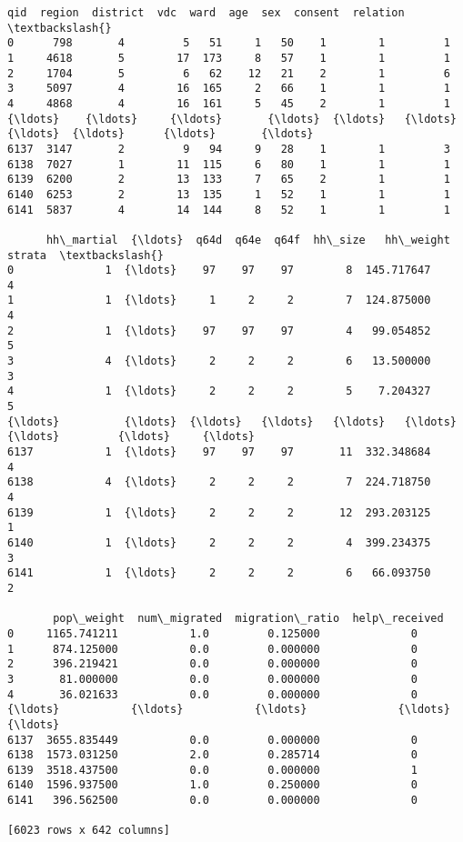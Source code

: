 \documentclass[11pt]{article}
\makeatletter
\newcommand{\boxspacing}{\kern\kvtcb@left@rule\kern\kvtcb@boxsep}
\newcommand{\prompt}[4]{
        {\ttfamily\llap{{\color{#2}[#3]:\hspace{3pt}#4}}\vspace{-\baselineskip}}
    }
\makeatother
\begin{document}
            \begin{tcolorbox}[breakable, size=fbox, boxrule=.5pt, pad at break*=1mm, opacityfill=0]
\prompt{Out}{outcolor}{13}{\boxspacing}
\begin{Verbatim}[commandchars=\\\{\}]
       qid  region  district  vdc  ward  age  sex  consent  relation  \textbackslash{}
0      798       4         5   51     1   50    1        1         1
1     4618       5        17  173     8   57    1        1         1
2     1704       5         6   62    12   21    2        1         6
3     5097       4        16  165     2   66    1        1         1
4     4868       4        16  161     5   45    2        1         1
{\ldots}    {\ldots}     {\ldots}       {\ldots}  {\ldots}   {\ldots}  {\ldots}  {\ldots}      {\ldots}       {\ldots}
6137  3147       2         9   94     9   28    1        1         3
6138  7027       1        11  115     6   80    1        1         1
6139  6200       2        13  133     7   65    2        1         1
6140  6253       2        13  135     1   52    1        1         1
6141  5837       4        14  144     8   52    1        1         1

      hh\_martial  {\ldots}  q64d  q64e  q64f  hh\_size   hh\_weight  strata  \textbackslash{}
0              1  {\ldots}    97    97    97        8  145.717647       4
1              1  {\ldots}     1     2     2        7  124.875000       4
2              1  {\ldots}    97    97    97        4   99.054852       5
3              4  {\ldots}     2     2     2        6   13.500000       3
4              1  {\ldots}     2     2     2        5    7.204327       5
{\ldots}          {\ldots}  {\ldots}   {\ldots}   {\ldots}   {\ldots}      {\ldots}         {\ldots}     {\ldots}
6137           1  {\ldots}    97    97    97       11  332.348684       4
6138           4  {\ldots}     2     2     2        7  224.718750       4
6139           1  {\ldots}     2     2     2       12  293.203125       1
6140           1  {\ldots}     2     2     2        4  399.234375       3
6141           1  {\ldots}     2     2     2        6   66.093750       2

       pop\_weight  num\_migrated  migration\_ratio  help\_received
0     1165.741211           1.0         0.125000              0
1      874.125000           0.0         0.000000              0
2      396.219421           0.0         0.000000              0
3       81.000000           0.0         0.000000              0
4       36.021633           0.0         0.000000              0
{\ldots}           {\ldots}           {\ldots}              {\ldots}            {\ldots}
6137  3655.835449           0.0         0.000000              0
6138  1573.031250           2.0         0.285714              0
6139  3518.437500           0.0         0.000000              1
6140  1596.937500           1.0         0.250000              0
6141   396.562500           0.0         0.000000              0

[6023 rows x 642 columns]
\end{Verbatim}
\end{tcolorbox}
        
\end{document}
